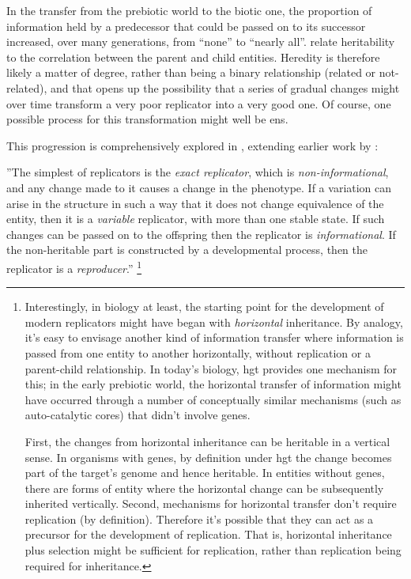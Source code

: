 In the transfer from the prebiotic world to the biotic one, the proportion of information held by a predecessor that could be passed on to its successor increased, over many generations, from ``none'' to ``nearly all''. \Textcite{Vasas2012a} relate heritability to the correlation between the parent and child entities. Heredity is therefore likely a matter of degree, rather than being a binary relationship (related or not-related), and that opens up the possibility that a series of gradual changes might over time transform a very poor replicator into a very good one. Of course, one possible process for this transformation might well be \gls{ens}.

This progression is comprehensively explored in \textcite{Zachar2010}, extending earlier work by \textcite{Szathmary1999,Szathmary:2006ty}: 

''The simplest of replicators is the \emph{exact replicator}, which is \emph{non-informational}, and any change made to it causes a change in the phenotype. If a variation can arise in the structure in such a way that it does not change equivalence of the entity, then it is a \emph{variable} replicator, with more than one stable state. If such changes can be passed on to the offspring then the replicator is \emph{informational}. If the non-heritable part is constructed by a developmental process, then the replicator is a \emph{reproducer}.'' \parencite[p.21]{Zachar2010}\footnote{Interestingly, in biology at least, the starting point for the development of modern replicators might have began with \emph{horizontal} inheritance. By analogy, it’s easy to envisage another kind of information transfer where information is passed from one entity to another horizontally, without replication or a parent-child relationship. In today’s biology, \gls{hgt} provides one mechanism for this; in the early prebiotic world, the horizontal transfer of information might have occurred through a number of conceptually similar mechanisms (such as auto-catalytic cores) that didn’t involve genes. 

First, the changes from horizontal inheritance can be heritable in a vertical sense. In organisms with genes, by definition under \gls{hgt} the change becomes part of the target’s genome and hence heritable. In entities without genes, there are forms of entity where the horizontal change can be subsequently inherited vertically. Second, mechanisms for horizontal transfer don’t require replication (by definition). Therefore it’s possible that they can act as a precursor for the development of replication. That is, horizontal inheritance plus selection might be sufficient for replication, rather than replication being required for inheritance.}


